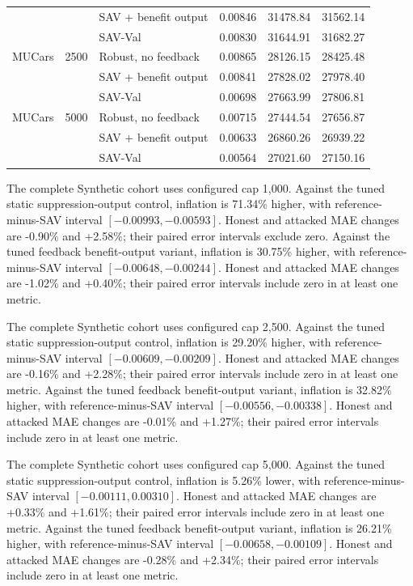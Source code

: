 \documentclass[10pt,journal]{IEEEtran}
\begin{document}
\begin{table}[t]
\begin{tabular}{lrlrrr}
 &  & SAV + benefit output & 0.00846 & 31478.84 & 31562.14\\
 &  & SAV-Val & 0.00830 & 31644.91 & 31682.27\\
\midrule
MUCars & 2500 & Robust, no feedback & 0.00865 & 28126.15 & 28425.48\\
 &  & SAV + benefit output & 0.00841 & 27828.02 & 27978.40\\
 &  & SAV-Val & 0.00698 & 27663.99 & 27806.81\\
\midrule
MUCars & 5000 & Robust, no feedback & 0.00715 & 27444.54 & 27656.87\\
 &  & SAV + benefit output & 0.00633 & 26860.26 & 26939.22\\
 &  & SAV-Val & 0.00564 & 27021.60 & 27150.16\\
\bottomrule
\end{tabular}
\end{table}

The complete Synthetic cohort uses configured cap 1,000. Against the tuned static suppression-output control, inflation is 71.34\% higher, with reference-minus-SAV interval $[-0.00993,-0.00593]$. Honest and attacked MAE changes are -0.90\% and +2.58\%; their paired error intervals exclude zero. Against the tuned feedback benefit-output variant, inflation is 30.75\% higher, with reference-minus-SAV interval $[-0.00648,-0.00244]$. Honest and attacked MAE changes are -1.02\% and +0.40\%; their paired error intervals include zero in at least one metric.

The complete Synthetic cohort uses configured cap 2,500. Against the tuned static suppression-output control, inflation is 29.20\% higher, with reference-minus-SAV interval $[-0.00609,-0.00209]$. Honest and attacked MAE changes are -0.16\% and +2.28\%; their paired error intervals include zero in at least one metric. Against the tuned feedback benefit-output variant, inflation is 32.82\% higher, with reference-minus-SAV interval $[-0.00556,-0.00338]$. Honest and attacked MAE changes are -0.01\% and +1.27\%; their paired error intervals include zero in at least one metric.

The complete Synthetic cohort uses configured cap 5,000. Against the tuned static suppression-output control, inflation is 5.26\% lower, with reference-minus-SAV interval $[-0.00111,0.00310]$. Honest and attacked MAE changes are +0.33\% and +1.61\%; their paired error intervals include zero in at least one metric. Against the tuned feedback benefit-output variant, inflation is 26.21\% higher, with reference-minus-SAV interval $[-0.00658,-0.00109]$. Honest and attacked MAE changes are -0.28\% and +2.34\%; their paired error intervals include zero in at least one metric.
\end{document}
